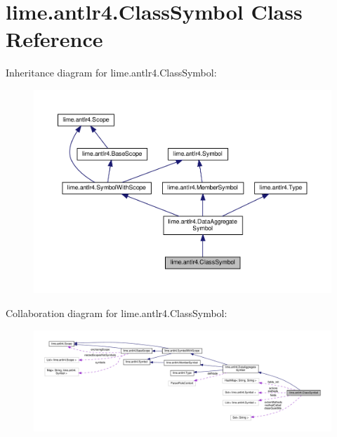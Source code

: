 \hypertarget{classlime_1_1antlr4_1_1ClassSymbol}{}\section{lime.\+antlr4.\+Class\+Symbol Class Reference}
\label{classlime_1_1antlr4_1_1ClassSymbol}


Inheritance diagram for lime.\+antlr4.\+Class\+Symbol\+:
\nopagebreak
\begin{figure}[H]
\begin{center}
\leavevmode
\includegraphics[width=350pt]{classlime_1_1antlr4_1_1ClassSymbol__inherit__graph}
\end{center}
\end{figure}


Collaboration diagram for lime.\+antlr4.\+Class\+Symbol\+:
\nopagebreak
\begin{figure}[H]
\begin{center}
\leavevmode
\includegraphics[width=350pt]{classlime_1_1antlr4_1_1ClassSymbol__coll__graph}
\end{center}
\end{figure}
